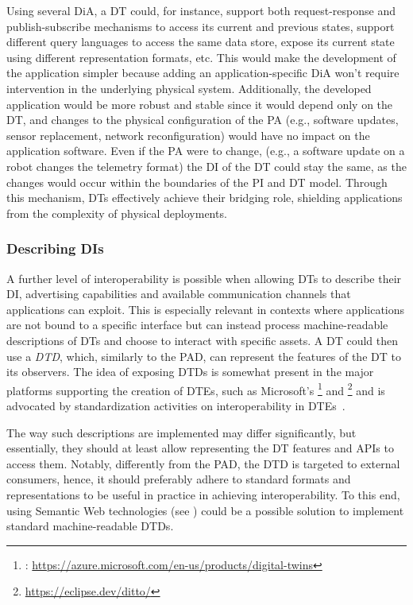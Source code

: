 Using several \ac{DiA}, a \ac{DT} could, for instance, support both request-response and publish-subscribe mechanisms to access its current and previous states, support different query languages to access the same data store, expose its current state using different representation formats, etc.
%
This would make the development of the application simpler because adding an application-specific \ac{DiA} won't require intervention in the underlying physical system. 
%
Additionally, the developed application would be more robust and stable since it would depend only on the \ac{DT}, and changes to the physical configuration of the \ac{PA} (e.g., software updates, sensor replacement, network reconfiguration) would have no impact on the application software.
%
Even if the \ac{PA} were to change, (e.g., a software update on a robot changes the telemetry format) the \ac{DI} of the \ac{DT} could stay the same, as the changes would occur within the boundaries of the \ac{PI} and \ac{DT} model.
%
Through this mechanism, \acp{DT} effectively achieve their bridging role, shielding applications from the complexity of physical deployments.

\subsubsection{Describing \aclp{DI}}

A further level of interoperability is possible when allowing \acp{DT} to describe their \ac{DI}, advertising capabilities and available communication channels that applications can exploit.
%
This is especially relevant in contexts where applications are not bound to a specific interface but can instead process machine-readable descriptions of \acp{DT} and choose to interact with specific assets.
%
A \ac{DT} could then use a \emph{\ac{DTD}}, which, similarly to the \ac{PAD}, can represent the features of the \ac{DT} to its observers.
%
The idea of exposing \acp{DTD} is somewhat present in the major platforms supporting the creation of \acp{DTE}, such as 
Microsoft's \azureTwin{}\footnote{\azureTwin{}: \url{https://azure.microsoft.com/en-us/products/digital-twins}} and \ditto{}\footnote{\ditto{} \url{https://eclipse.dev/ditto/}} and is advocated by standardization activities on interoperability in \acp{DTE}~\cite{etsi-dt-comm-requirements-2024}.

The way such descriptions are implemented may differ significantly, but essentially, they should at least allow representing the \ac{DT}  features and APIs to access them.
%
Notably, differently from the \ac{PAD}, the \ac{DTD} is targeted to external consumers, hence, it should preferably adhere to standard formats and representations to be useful in practice in achieving interoperability.
%
To this end, using Semantic Web technologies (see ) could be a possible solution to implement standard machine-readable \acp{DTD}.

